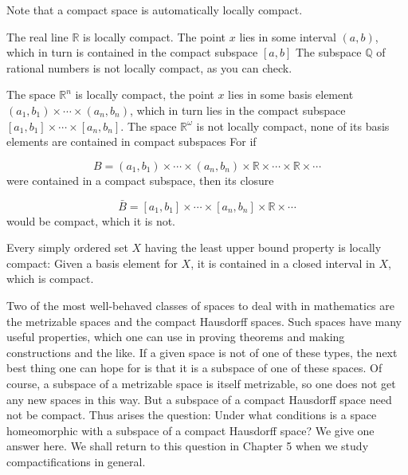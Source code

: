 Note that a compact space is automatically locally compact.

\begin{centeredblock}
\begin{example}
\label{ex:\thesection.\theexample}
 The real line \(\mathbb{R}\) is locally compact. The point \(x\) lies in some interval \((a, b)\), which in turn is contained in the compact subspace \([ {a,b}]\) The subspace \(\mathbb{Q}\) of rational numbers is not locally compact, as you can check.
\end{example}
\end{centeredblock}

\begin{centeredblock*}
\begin{example}
\label{ex:\thesection.\theexample}
 The space \(\mathbb{R}^{n}\) is locally compact, the point \(x\) lies in some basis element \(( {a_{1},b_{1}}) \times \cdots \times ( {a_{n},b_{n}})\), which in turn lies in the compact subspace \([ {a_{1},b_{1}}] \times \cdots \times [ {a_{n},b_{n}}]\). The space \(\mathbb{R}^{\omega }\) is not locally compact, none of its basis elements are contained in compact subspaces For if

\[
B = ( {a_{1},b_{1}}) \times \cdots \times ( {a_{n},b_{n}}) \times \mathbb{R} \times \cdots \times \mathbb{R} \times \cdots
\]
were contained in a compact subspace, then its closure

\[
\bar{B} = [ {a_{1},b_{1}}] \times \cdots \times [ {a_{n},b_{n}}] \times \mathbb{R} \times \cdots
\]
would be compact, which it is not.
\end{example}
\end{centeredblock*}

\begin{centeredblock}
\begin{example}
\label{ex:\thesection.\theexample}
 Every simply ordered set \(X\) having the least upper bound property is locally compact: Given a basis element for \(X\), it is contained in a closed interval in \(X\), which is compact.
\end{example}
\end{centeredblock}

Two of the most well-behaved classes of spaces to deal with in mathematics are the metrizable spaces and the compact Hausdorff spaces. Such spaces have many useful properties, which one can use in proving theorems and making constructions and the like. If a given space is not of one of these types, the next best thing one can hope for is that it is a subspace of one of these spaces. Of course, a subspace of a metrizable space is itself metrizable, so one does not get any new spaces in this way. But a subspace of a compact Hausdorff space need not be compact. Thus arises the question: Under what conditions is a space homeomorphic with a subspace of a compact Hausdorff space? We give one answer here. We shall return to this question in Chapter 5 when we study compactifications in general.

